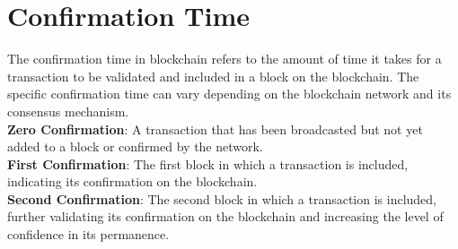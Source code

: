 \documentclass{article}
\begin{document}
\section{Confirmation Time}
The confirmation time in blockchain refers to the amount of time it takes for a transaction to be validated and included in a block on the blockchain. The specific confirmation time can vary depending on the blockchain network and its consensus mechanism.\\
\textbf{Zero Confirmation}: A transaction that has been broadcasted but not yet added to a block or confirmed by the network.\\
\textbf{First Confirmation}: The first block in which a transaction is included, indicating its confirmation on the blockchain.\\
\textbf{Second Confirmation}: The second block in which a transaction is included, further validating its confirmation on the blockchain and increasing the level of confidence in its permanence.
\newpage
\begin{figure}
\centering
\end{figure}
\end{document}
